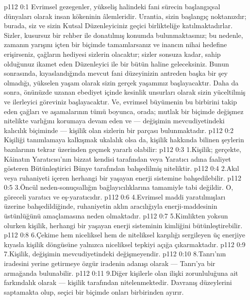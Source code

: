 \vs p112 0:1 Evrimsel gezegenler, yükseliş halindeki fani sürecin başlangıçsal dünyaları olarak insan kökeninin âlemleridir. Urantia, sizin başlangıç noktanızdır; burada, siz ve sizin Kutsal Düzenleyiciniz geçici birlikteliğe katılmaktadırlar. Sizler, kusursuz bir rehber ile donatılmış konumda bulunmaktasınız; bu nedenle, zamanın yarışını içten bir biçimde tamamlarsanız ve inancın nihai hedefine erişirseniz, çağların hediyesi sizlerin olacaktır; sizler sonsuza kadar, sahip olduğunuz ikamet eden Düzenleyici ile bir bütün haline geleceksiniz. Bunun sonrasında, kıyaslandığında mevcut fani düzeyinizin antreden başka bir şey olmadığı, yükselen yaşam olarak sizin gerçek yaşamınız başlayacaktır. Daha da sonra, önünüzde uzanan ebediyet içinde kesinlik unsurları olarak sizin yüceltilmiş ve ilerleyici göreviniz başlayacaktır. Ve, evrimsel büyümenin bu birbirini takip eden çağları ve aşamalarının tümü boyunca, orada; mutlak bir biçimde değişmez nitelikte varlığını korumaya devam eden ve --- değişimin mevcudiyetindeki kalıcılık biçiminde --- kişilik olan sizlerin bir parçası bulunmaktadır.
\vs p112 0:2 Kişiliği tanımlamaya kalkışmak ukalalık olsa da, kişilik hakkında bilinen şeylerin bazılarının tekrar üzerinden geçmek yararlı olabilir:
\vs p112 0:3 1.\bibnobreakspace Kişilik; gerçekte, Kâinatın Yaratıcısı’nın bizzat kendisi tarafından veya Yaratıcı adına faaliyet gösteren Bütünleştirici Bünye tarafından bahşedilmiş niteliktir.
\vs p112 0:4 2.\bibnobreakspace Akıl veya ruhaniyeti içeren herhangi bir yaşayan enerji sistemine bahşedilebilir.
\vs p112 0:5 3.\bibnobreakspace Öncül neden\hyp{}sonuçsallığın bağlayıcılıklarına tamamiyle tabi değildir. O, göreceli yaratıcı ve eş\hyp{}yaratıcıdır.
\vs p112 0:6 4.\bibnobreakspace Evrimsel maddi yaratılmışları üzerine bahşedildiğinde, ruhaniyetin aklın aracılığıyla enerji\hyp{}maddesinin üstünlüğünü amaçlamasına neden olmaktadır.
\vs p112 0:7 5.\bibnobreakspace Kimlikten yoksun olurken kişilik, herhangi bir yaşayan enerji sisteminin kimliğini bütünleştirebilir.
\vs p112 0:8 6.\bibnobreakspace Çekime hem niceliksel hem de niteliksel karşılığı sergileyen üç enerjiye kıyasla kişilik döngüsüne yalnızca niceliksel tepkiyi açığa çıkarmaktadır.
\vs p112 0:9 7.\bibnobreakspace Kişilik, değişimin mevcudiyetindeki değişmeyendir.
\vs p112 0:10 8.\bibnobreakspace Tanrı’nın iradesini yerine getirmeye özgür iradenin adanışı olarak --- Tanrı’ya bir armağanda bulunabilir.
\vs p112 0:11 9.\bibnobreakspace Diğer kişilerle olan ilişki zorunluluğuna ait farkındalık olarak --- kişilik tarafından nitelenmektedir. Davranış düzeylerini saptamakta olup, seçici bir biçimde onları birbirinden ayırır.
